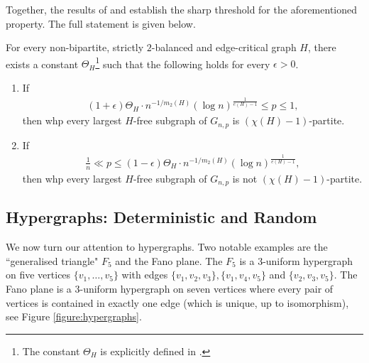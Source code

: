 \documentclass[11pt,a4paper,oneside,reqno]{amsart}
\newcommand{\1}{\mathbbm{1}} %
\renewcommand{\le}{\leqslant}
\begin{document}
Together, the results of \cite{hoshen2023simonovits} and \cite{hoshen2024stabilitylargecutsrandom} establish the sharp threshold for the aforementioned property. The full statement is given below.
\begin{thm}\cite{hoshen2023simonovits,hoshen2024stabilitylargecutsrandom}\label{thm:Simonovits-threshold}
    For every non-bipartite, strictly $2$-balanced and edge-critical graph $H$, there exists a constant $\Theta_H$\footnote{The constant $\Theta_H$ is explicitly defined in \cite{hoshen2023simonovits}.} such that the following holds for every $\epsilon > 0$.

    \begin{enumerate}[label=(\roman*), ref=\thethm(\roman*), itemsep=0pt, topsep=4pt]
        \item If
        \begin{align*}
            (1+\epsilon) \Theta_H \cdot n^{-1/m_2(H)} \left(\log n\right)^{\frac{1}{e(H)-1}} \le p \le 1,
        \end{align*} 
        then whp every largest $H$-free subgraph of $G_{n, p}$ is $(\chi(H)-1)$-partite.

        \item If
        \begin{align*}
            \frac{1}{n} \ll p \le (1-\epsilon) \Theta_H \cdot n^{-1/m_2(H)} \left(\log n\right)^{\frac{1}{e(H)-1}},
        \end{align*}     
        then whp every largest $H$-free subgraph of $G_{n, p}$ is not $(\chi(H)-1)$-partite.
        \end{enumerate}   
\end{thm}



\subsection*{Hypergraphs: Deterministic and Random}
We now turn our attention to hypergraphs. Two notable examples are the ``generalised triangle" $F_5$ and the Fano plane. The $F_5$ is a $3$-uniform hypergraph on five vertices $\{v_1, \dots, v_5\}$ with edges $\{v_1, v_2, v_3\}, \{v_1, v_4, v_5\}$ and $\{v_2, v_3, v_5\}$. The Fano plane is a $3$-uniform hypergraph on seven vertices where every pair of vertices is contained in exactly one edge (which is unique, up to isomorphism), see Figure \ref{figure:hypergraphs}.
\end{document}
